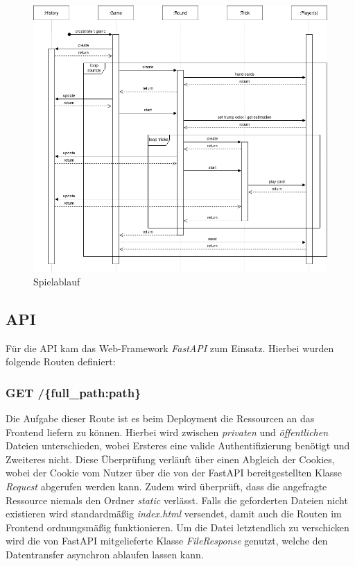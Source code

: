 \begin{figure}
	\includegraphics[width=\textwidth]{images/game-flow.png}
	\caption{Spielablauf}
	\label{fig:game-flow}
\end{figure}

\subsection{API}
Für die API kam das Web-Framework \textit{FastAPI} zum Einsatz. Hierbei wurden folgende Routen definiert:

\subsubsection{GET /\{full\_path:path\}}
Die Aufgabe dieser Route ist es beim Deployment die Ressourcen an das Frontend liefern zu können. Hierbei wird zwischen \textit{privaten} und \textit{öffentlichen} Dateien unterschieden, wobei Ersteres eine valide Authentifizierung benötigt und Zweiteres nicht. Diese Überprüfung verläuft über einen Abgleich der Cookies, wobei der Cookie vom Nutzer über die von der FastAPI bereitgestellten Klasse \textit{Request} abgerufen werden kann. Zudem wird überprüft, dass die angefragte Ressource niemals den Ordner \textit{static} verlässt. Falls die geforderten Dateien nicht existieren wird standardmäßig \textit{index.html} versendet, damit auch die Routen im Frontend ordnungsmäßig funktionieren. Um die Datei letztendlich zu verschicken wird die von FastAPI mitgelieferte Klasse \textit{FileResponse} genutzt, welche den Datentransfer asynchron ablaufen lassen kann. \cite{fastapi-fileresponse}


